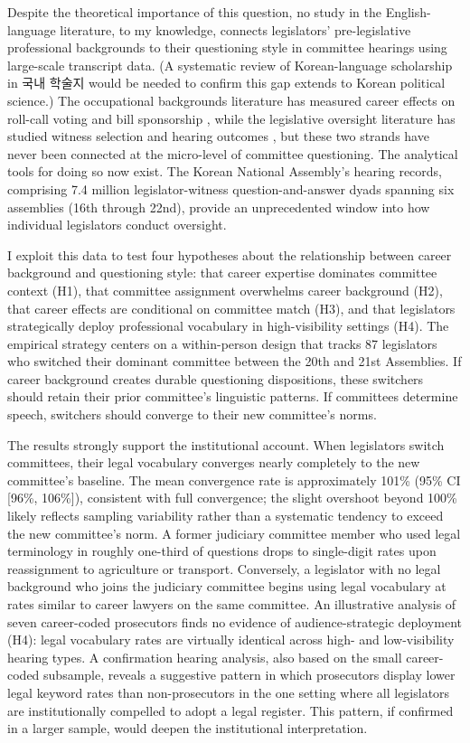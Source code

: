 \documentclass[11pt]{article}
\begin{document}
Despite the theoretical importance of this question, no study in the English-language literature, to my knowledge, connects legislators' pre-legislative professional backgrounds to their questioning style in committee hearings using large-scale transcript data. (A systematic review of Korean-language scholarship in 국내 학술지 would be needed to confirm this gap extends to Korean political science.) The occupational backgrounds literature has measured career effects on roll-call voting and bill sponsorship \citep{ogrady2018, bailer2021}, while the legislative oversight literature has studied witness selection and hearing outcomes \citep{ban2023, ban2025}, but these two strands have never been connected at the micro-level of committee questioning. The analytical tools for doing so now exist. The Korean National Assembly's hearing records, comprising 7.4 million legislator-witness question-and-answer dyads spanning six assemblies (16th through 22nd), provide an unprecedented window into how individual legislators conduct oversight.

I exploit this data to test four hypotheses about the relationship between career background and questioning style: that career expertise dominates committee context (H1), that committee assignment overwhelms career background (H2), that career effects are conditional on committee match (H3), and that legislators strategically deploy professional vocabulary in high-visibility settings (H4). The empirical strategy centers on a within-person design that tracks 87 legislators who switched their dominant committee between the 20th and 21st Assemblies. If career background creates durable questioning dispositions, these switchers should retain their prior committee's linguistic patterns. If committees determine speech, switchers should converge to their new committee's norms.

The results strongly support the institutional account. When legislators switch committees, their legal vocabulary converges nearly completely to the new committee's baseline. The mean convergence rate is approximately 101\% (95\% CI [96\%, 106\%]), consistent with full convergence; the slight overshoot beyond 100\% likely reflects sampling variability rather than a systematic tendency to exceed the new committee's norm. A former judiciary committee member who used legal terminology in roughly one-third of questions drops to single-digit rates upon reassignment to agriculture or transport. Conversely, a legislator with no legal background who joins the judiciary committee begins using legal vocabulary at rates similar to career lawyers on the same committee. An illustrative analysis of seven career-coded prosecutors finds no evidence of audience-strategic deployment (H4): legal vocabulary rates are virtually identical across high- and low-visibility hearing types. A confirmation hearing analysis, also based on the small career-coded subsample, reveals a suggestive pattern in which prosecutors display lower legal keyword rates than non-prosecutors in the one setting where all legislators are institutionally compelled to adopt a legal register. This pattern, if confirmed in a larger sample, would deepen the institutional interpretation.
\end{document}

